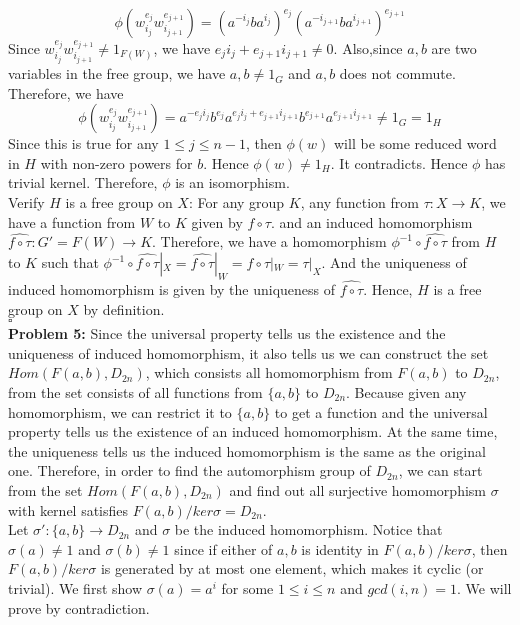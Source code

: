 \documentclass[12pt]{amsart}
\begin{document}
\[\phi(w_{i_j}^{e_{j}}w_{i_{j+1}}^{e_{j+1}})=(a^{-i_j}ba^{i_j})^{e_j}(a^{-i_{j+1}}ba^{i_{j+1}})^{e_{j+1}}\]
Since $w_{i_j}^{e_{j}}w_{i_{j+1}}^{e_{j+1}}\neq 1_{F(W)}$, we have $e_ji_j+e_{j+1}i_{j+1}\neq 0$. Also,since $a,b$ are two variables in the free group, we have $a,b\neq 1_G$ and $a,b$ does not commute. Therefore, we have 
\[\phi(w_{i_j}^{e_{j}}w_{i_{j+1}}^{e_{j+1}})=a^{-e_ji_j}b^{e_j}a^{e_ji_j+e_{j+1}i_{j+1}}b^{e_{j+1}}a^{e_{j+1}i_{j+1}}\neq 1_{G}=1_{H}\]
Since this is true for any $1\leq j\leq n-1$, then $\phi(w)$ will be some reduced word in $H$ with non-zero powers for $b$. Hence $\phi(w)\neq 1_H$. It contradicts. Hence $\phi$ has trivial kernel. Therefore, $\phi$ is an isomorphism.\\
Verify $H$ is a free group on $X$: For any group $K$, any function from $\tau:X\to K$, we have a function from $W$ to $K$ given by $f\circ \tau$. and an induced homomorphism 
$\widehat{f\circ \tau}:G'=F(W)\to K$. Therefore, we have a homomorphism $\phi^{-1}\circ\widehat{f\circ \tau} $ from $H$ to $K$ such that $\phi^{-1}\circ\widehat{f\circ \tau}|_X= \widehat{f\circ \tau}|_W=f\circ \tau|_W=\tau|_X$. And the uniqueness of induced homomorphism is given by the uniqueness of $\widehat{f\circ \tau} $. Hence, $H$ is a free group on $X$ by definition.\\
\phantom{qed}\hfill$\square$\\
\textbf{Problem 5:} Since the universal property tells us the existence and the uniqueness of induced homomorphism, it also tells us we can construct the set $Hom(F(a,b),D_{2n})$, which consists all homomorphism from $F(a,b)$ to $D_{2n}$, from the set consists of all functions from $\{a,b\}$ to $D_{2n}$. Because given any homomorphism, we can restrict it to $\{a,b\}$ to get a function and the universal property tells us the existence of an induced homomorphism. At the same time, the uniqueness tells us the induced homomorphism is the same as the original one. Therefore, in order to find the automorphism group of $D_{2n}$, we can start from the set $Hom(F(a,b),D_{2n})$ and find out all surjective homomorphism $\sigma$ with kernel satisfies $F(a,b)/ker\sigma=D_{2n}$.\\
Let $\sigma':\{a,b\}\to D_{2n}$ and $\sigma$ be the induced homomorphism. Notice that $\sigma(a)\neq 1 $ and $\sigma(b)\neq 1$ since if either of $a,b$ is identity in $F(a,b)/ker\sigma$, then $F(a,b)/ker\sigma$ is generated by at most one element, which makes it cyclic (or trivial). We first show $\sigma(a)=a^i$ for some $1\leq i\leq n$ and $gcd(i,n)=1$. We will prove by contradiction.\\
\end{document}
